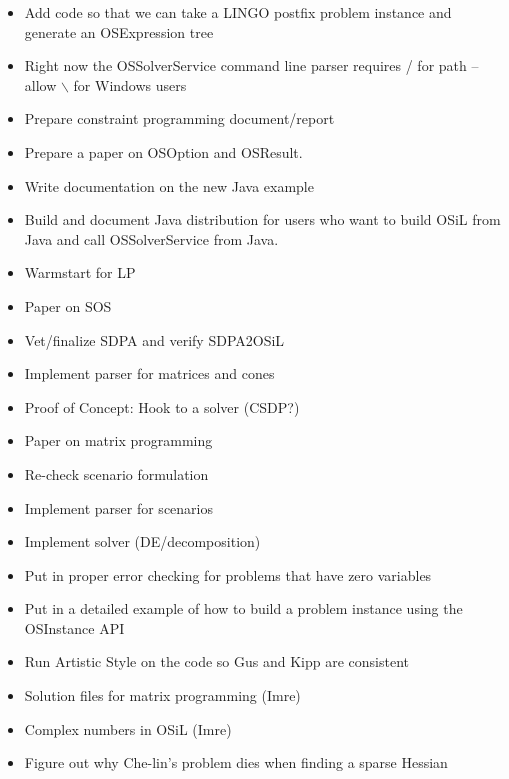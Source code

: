 \begin{itemize}
\item Add code so that we can take a LINGO postfix problem instance and generate an OSExpression tree

\item Right now the OSSolverService command line parser requires / for path -- allow {$\backslash$} for Windows users

\item Prepare constraint programming document/report

\item Prepare a paper on OSOption and OSResult.

\item Write documentation on the new Java example 

\item Build and document Java distribution for users who want to build OSiL from Java and 
call OSSolverService from Java. 

\item Warmstart for LP

\item Paper on SOS

\item Vet/finalize SDPA and verify SDPA2OSiL

\item Implement parser for matrices and cones

\item Proof of Concept: Hook to a solver (CSDP?)

\item Paper on matrix programming

\item Re-check scenario formulation

\item Implement parser for scenarios

\item Implement solver (DE/decomposition)

\item Put in proper error checking for problems that have zero variables

\item Put in a detailed example of how to build a problem instance using the OSInstance API

\item Run Artistic Style on the code so Gus and Kipp are consistent

\item Solution files for matrix programming (Imre)

\item Complex numbers in OSiL (Imre)

\item Figure out why Che-lin's problem dies when finding a sparse Hessian

\end{itemize}
